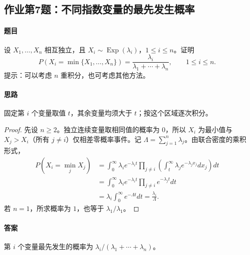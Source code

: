 \subsection{作业第7题：不同指数变量的最先发生概率}\label{ex:w12-h7}
\paragraph{题目}
设 $X_1,\ldots,X_n$ 相互独立，且 $X_i\sim\operatorname{Exp}(\lambda_i)$，$1\leq i\leq n$。证明
\[
P(X_i=\min\{X_1,\ldots,X_n\})
=\frac{\lambda_i}{\lambda_1+\cdots+\lambda_n},\qquad1\leq i\leq n.
\]
提示：可以考虑 $n$ 重积分，也可考虑其他方法。
\paragraph{思路}固定第 $i$ 个变量取值 $t$，其余变量均须大于 $t$；按这个区域逐次积分。
\begin{proof}
先设 $n\geq2$。独立连续变量取相同值的概率为 $0$，所以 $X_i$ 为最小值与 $X_j>X_i$（所有 $j\ne i$）仅相差零概率事件。记 $\Lambda=\sum_{j=1}^n\lambda_j$。由联合密度的乘积形式，
\begin{align*}
P(X_i=\min_jX_j)
&=\int_0^\infty\lambda_i e^{-\lambda_i t}
\prod_{j\ne i}\left(\int_t^\infty\lambda_je^{-\lambda_jx_j}dx_j\right)dt\\
&=\int_0^\infty\lambda_i e^{-\lambda_i t}
\prod_{j\ne i}e^{-\lambda_jt}dt\\
&=\lambda_i\int_0^\infty e^{-\Lambda t}dt
=\frac{\lambda_i}{\Lambda}.
\end{align*}
若 $n=1$，所求概率为 $1$，也等于 $\lambda_1/\lambda_1$。
\end{proof}
\paragraph{答案}第 $i$ 个变量最先发生的概率为 $\lambda_i/(\lambda_1+\cdots+\lambda_n)$。
